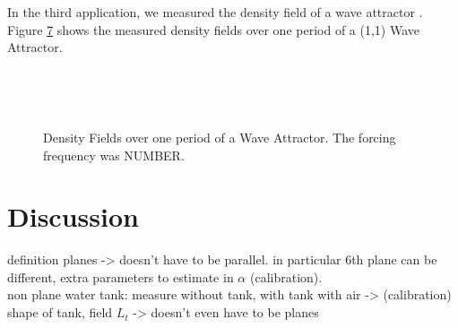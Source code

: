 \documentclass{article}
\begin{document}
In the third application, we measured the density field of a wave attractor \cite{maas1997observation}. Figure \ref{figs:WA0side} shows the measured density fields over one period of a (1,1) Wave Attractor. 
\begin{figure}[htbp]
\begin{subfigure}{.5\linewidth}
		\label{fig:WA0side}
\end{subfigure}%
\begin{subfigure}{.5\linewidth}
		\label{fig:WA6side}
\end{subfigure} \\
\begin{subfigure}{.5\linewidth}
		\label{fig:WA3side}
\end{subfigure}%
\begin{subfigure}{.5\linewidth}
		\label{fig:WA2side}
\end{subfigure} \\
\begin{subfigure}{.5\linewidth}
		\label{fig:WA23side}
\end{subfigure}%
\begin{subfigure}{.5\linewidth}
		\label{fig:WA56side}
\end{subfigure} 
\caption{Density Fields over one period of a Wave Attractor. The forcing frequency was NUMBER. }
\label{figs:WA0side}
\end{figure}

\section{Discussion}

definition planes -> doesn't have to be parallel. in particular 6th plane can be different, extra parameters to estimate in $\alpha$ (calibration). \\
non plane water tank: measure without tank, with tank with air -> (calibration) shape of tank, field $L_t$
-> doesn't even have to be planes

\printbibliography[heading=bibintoc]



\end{document}
